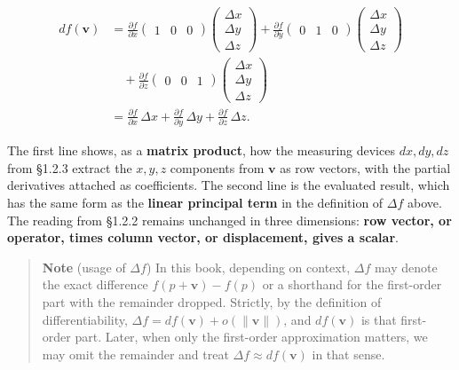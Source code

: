\documentclass[a4paper,12pt,openany]{book}
\begin{document}
\[
\begin{aligned}
df(\mathbf{v})
&=\frac{\partial f}{\partial x}
\begin{pmatrix}1&0&0\end{pmatrix}
\begin{pmatrix}\Delta x\\\Delta y\\\Delta z\end{pmatrix}
+\frac{\partial f}{\partial y}
\begin{pmatrix}0&1&0\end{pmatrix}
\begin{pmatrix}\Delta x\\\Delta y\\\Delta z\end{pmatrix}\\
&\quad+\frac{\partial f}{\partial z}
\begin{pmatrix}0&0&1\end{pmatrix}
\begin{pmatrix}\Delta x\\\Delta y\\\Delta z\end{pmatrix}\\
&=\frac{\partial f}{\partial x}\,\Delta x+
\frac{\partial f}{\partial y}\,\Delta y+
\frac{\partial f}{\partial z}\,\Delta z.
\end{aligned}
\]

The first line shows, as a \textbf{matrix product}, how the measuring
devices \(dx,dy,dz\) from §1.2.3 extract the \(x,y,z\) components from
\(\mathbf{v}\) as row vectors, with the partial derivatives attached as
coefficients. The second line is the evaluated result, which has the
same form as the \textbf{linear principal term} in the definition of
\(\Delta f\) above. The reading from §1.2.2 remains unchanged in three
dimensions:
\textbf{row vector, or operator, times column vector, or displacement, gives a scalar}.

\begin{quote}
\textbf{Note} (usage of \(\Delta f\)) In this book, depending on
context, \(\Delta f\) may denote the exact difference
\(f(p+\mathbf{v})-f(p)\) or a shorthand for the first-order part with
the remainder dropped. Strictly, by the definition of differentiability,
\(\Delta f = df(\mathbf{v}) + o(\|\mathbf{v}\|)\), and
\(df(\mathbf{v})\) is that first-order part. Later, when only the
first-order approximation matters, we may omit the remainder and treat
\(\Delta f \approx df(\mathbf{v})\) in that sense.
\end{quote}
\end{document}
